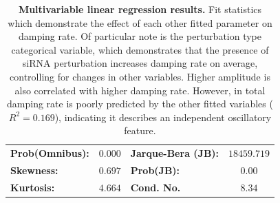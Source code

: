\documentclass[11pt, letterpaper]{article}
\begin{document}
\begin{table}
\begin{center}
\begin{tabular}{lclc}
\textbf{Prob(Omnibus):} &$  0.000 $& \textbf{  Jarque-Bera (JB):  } &$18459.719$ \\
\textbf{Skewness:}          &$  0.697 $& \textbf{  Prob(JB):          } &$     0.00$ \\
\textbf{Kurtosis:}      &$  4.664 $& \textbf{  Cond. No.          } &$     8.34$ \\
\bottomrule
\end{tabular}
\end{center} 
\caption{{\bfseries Multivariable linear regression results.} Fit statistics which demonstrate the effect of each other fitted parameter on damping rate. Of particular note is the perturbation type categorical variable, which demonstrates that the presence of siRNA perturbation increases damping rate on average, controlling for changes in other variables. Higher amplitude is also correlated with higher damping rate. However, in total damping rate is poorly predicted by the other fitted variables ($R^2 = 0.169$), indicating it describes an independent oscillatory feature.}
\label{tab:ols_reg}
\end{table}
\end{document}
